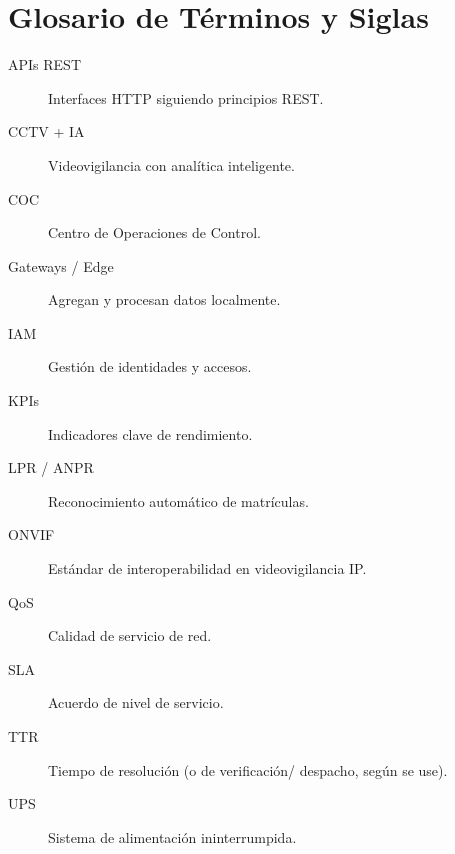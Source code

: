 \documentclass[12pt,a4paper]{article}
\begin{document}
\section*{Glosario de Términos y Siglas}
\begin{description}
\item[APIs REST] Interfaces HTTP siguiendo principios REST.
\item[CCTV + IA] Videovigilancia con analítica inteligente.
\item[COC] Centro de Operaciones de Control.
\item[Gateways / Edge] Agregan y procesan datos localmente.
\item[IAM] Gestión de identidades y accesos.
\item[KPIs] Indicadores clave de rendimiento.
\item[LPR / ANPR] Reconocimiento automático de matrículas.
\item[ONVIF] Estándar de interoperabilidad en videovigilancia IP.
\item[QoS] Calidad de servicio de red.
\item[SLA] Acuerdo de nivel de servicio.
\item[TTR] Tiempo de resolución (o de verificación/ despacho, según se use).
\item[UPS] Sistema de alimentación ininterrumpida.
\end{description}

\end{document}

